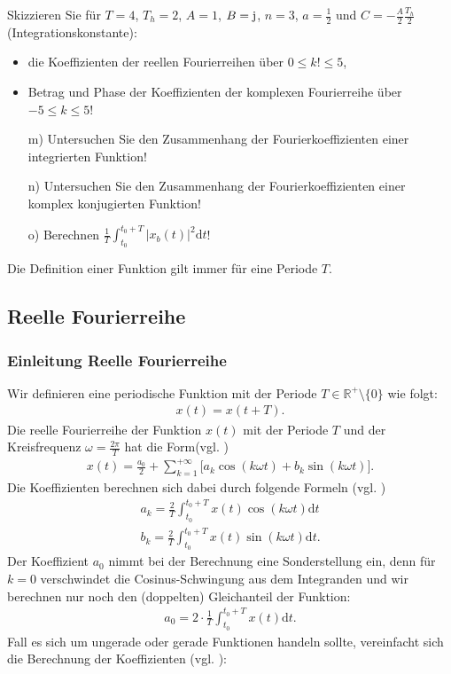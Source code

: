 \documentclass[11pt,a4paper,DIV=12]{scrartcl}
\newcommand{\diff}{\mathrm{d}}
\begin{document}
Skizzieren Sie für $T=4$, $T_h=2$, $A=1$, $B=\im$, $n= 3$, $a=\frac{1}{2}$ und $C=-\frac{A}{2}\frac{T_h}{2}$ (Integrationskonstante):
\begin{itemize}
	\item die Koeffizienten der reellen Fourierreihen über $0\leq k! \leq 5$,
	\item Betrag und Phase der Koeffizienten der komplexen Fourierreihe über $-5\leq k \leq 5$!
\end{itemize}
\begin{itemize}
	\item[m) ] Untersuchen Sie den Zusammenhang der Fourierkoeffizienten einer integrierten Funktion!
	\item[n) ] Untersuchen Sie den Zusammenhang der Fourierkoeffizienten einer komplex konjugierten Funktion!
	\item[o) ] Berechnen $\frac{1}{T}\int_{t_0}^{t_0+T}|x_b(t)|^2\diff t$!
\end{itemize}
Die Definition einer Funktion gilt immer für eine Periode $T$.
\newpage
\subsection*{Reelle Fourierreihe}
\subsubsection*{Einleitung Reelle Fourierreihe}
Wir definieren eine periodische Funktion mit der Periode $T\in\mathbb{R}^+\setminus\{0\}$ wie folgt:
\begin{align}
	x(t)=x(t+T).
\end{align}
Die reelle Fourierreihe der Funktion $x(t)$ mit der Periode $T$ und der Kreisfrequenz $\omega=\frac{2\pi}{T}$ hat die Form(vgl. \cite[Kap. 7, S. 488]{Bronstein})
\begin{align}
	\label{eq:RealFourierSeries}
	x(t)=\frac{a_0}{2}+\sum_{k=1}^{+\infty}\Bigg [ a_k\cos(k\omega t)+b_k\sin(k\omega t)\Bigg ].
\end{align}
Die Koeffizienten berechnen sich dabei durch folgende Formeln (vgl. \cite[Kap. 7, S. 487]{Bronstein})
\begin{gather}
	\label{eq:Koeff}
	a_k=\frac{2}{T}\int_{t_0}^{t_0+T}x(t)\cos(k\omega t)\diff t \\
	b_k=\frac{2}{T}\int_{t_0}^{t_0+T}x(t)\sin(k\omega t)\diff t.
\end{gather}
Der Koeffizient $a_0$ nimmt bei der Berechnung eine Sonderstellung ein, denn für $k=0$ verschwindet die Cosinus-Schwingung aus dem Integranden und wir berechnen nur noch den (doppelten) Gleichanteil der Funktion:
\begin{align}
	\label{eq:A0}
	a_0=2\cdot\frac{1}{T}\int_{t_0}^{t_0+T}x(t)\diff t.
\end{align}
Fall es sich um ungerade oder gerade Funktionen handeln sollte, vereinfacht sich die Berechnung der Koeffizienten (vgl. \cite[Kap.7, S. 489]{Bronstein}):
\end{document}
